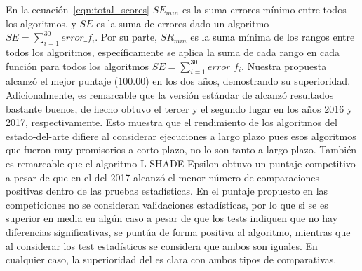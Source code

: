 En la ecuación~\ref{eqn:total_scores} $SE_{min}$ es la suma errores mínimo entre todos los algoritmos, y $SE$ es la suma de errores dado un algoritmo $SE = \sum_{i=1}^{30} error\_f_i$.
%
Por su parte, $SR_{min}$ es la suma mínima de los rangos entre todos los algoritmos, específicamente se aplica la suma de cada rango en cada función para todos 
los algoritmos $SE = \sum_{i=1}^{30} error\_f_i$.
%
Nuestra propuesta alcanzó el mejor puntaje ($100.00$) en los dos años, demostrando su superioridad. 
%
Adicionalmente, es remarcable que la versión estándar de \DE{} alcanzó resultados bastante buenos, de hecho obtuvo el tercer y el segundo lugar en los años 2016 y 2017, respectivamente.
%
Esto muestra que el rendimiento de los algoritmos del estado-del-arte difiere al considerar ejecuciones a largo plazo pues esos algoritmos que fueron muy promisorios a corto plazo,
no lo son tanto a largo plazo.
%
También es remarcable que el algoritmo L-SHADE-Epsilon obtuvo un puntaje competitivo a pesar de que en el \CEC{} del 2017 
alcanzó el menor número de comparaciones positivas dentro de las pruebas estadísticas.
%
En el puntaje propuesto en las competiciones no se consideran validaciones estadísticas, por lo que si se es superior en media en algún caso a pesar de que los tests
indiquen que no hay diferencias significativas, se puntúa de forma positiva al algoritmo, mientras que al considerar los test estadísticos se considera que ambos son iguales.
%
En cualquier caso, la superioridad del \DEEDM{} es clara con ambos tipos de comparativas.

%
%
%
%
%
%

